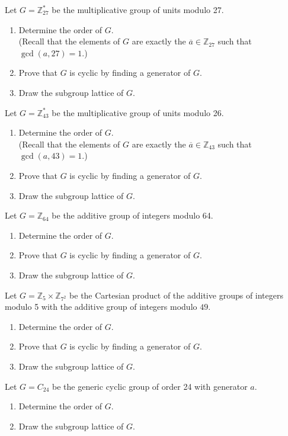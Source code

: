
\newcommand{\Z}{\mathbb{Z}}
\newcommand{\abar}{\overline{a}}


Let $G = \Z_{27}^*$ be the multiplicative group of units modulo 27.  
\begin{enumerate}[label=(\alph*)]
	\item Determine the order of $G$.\\
	(Recall that the elements of $G$ are exactly the $\abar\in \Z_{27}$ such that $\gcd(a,27)=1$.)
	\vskip 1in
	\item Prove that $G$ is cyclic by finding a generator of $G$.
	\vskip 2in
	\item Draw the subgroup lattice of $G$.
\end{enumerate}
	

Let $G = \Z_{43}^*$ be the multiplicative group of units modulo 26.  
\begin{enumerate}[label=(\alph*)]
	\item Determine the order of $G$.\\
	(Recall that the elements of $G$ are exactly the $\abar\in \Z_{43}$ such that $\gcd(a,43)=1$.)
	\vskip 1in
	\item Prove that $G$ is cyclic by finding a generator of $G$.
	\vskip 2in
	\item Draw the subgroup lattice of $G$.
\end{enumerate}


Let $G=\Z_{64}$ be the additive group of integers modulo 64.
\begin{enumerate}[label=(\alph*)]
	\item Determine the order of $G$.
	\vskip 1in
	\item Prove that $G$ is cyclic by finding a generator of $G$.
	\vskip 2in
	\item Draw the subgroup lattice of $G$.
\end{enumerate}
	

Let $G=\Z_{5}\times \Z_{7^2}$ be the Cartesian product of the additive groups of integers modulo 5 with the additive group of integers modulo $49$.
\begin{enumerate}[label=(\alph*)]
	\item Determine the order of $G$.
	\vskip 1in
	\item Prove that $G$ is cyclic by finding a generator of $G$.
	\vskip 2in
	\item Draw the subgroup lattice of $G$.
\end{enumerate}


Let $G=C_{24}$ be the generic cyclic group of order 24 with generator $a$.
\begin{enumerate}[label=(\alph*)]
	\item Determine the order of $G$.
	\vskip 1in
	\item Draw the subgroup lattice of $G$.
\end{enumerate}